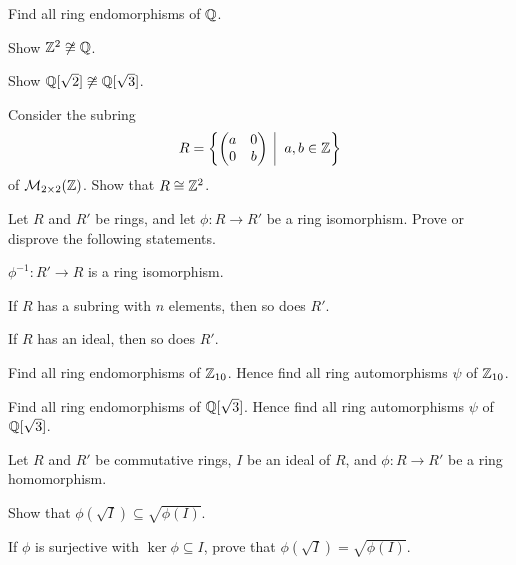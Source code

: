 \begin{problem}
    Find all ring endomorphisms of $\mathbb{Q}$.
\end{problem}

\begin{problem}
    Show $\mathbb{Z}^2 \not\cong \mathbb{Q}$.
\end{problem}

\begin{problem}
    Show $\mathbb{Q}[\sqrt2] \not\cong \mathbb{Q}[\sqrt3]$.
\end{problem}

\begin{problem}
    Consider the subring
    \[
        R = \left\{\begin{pmatrix}a&0\\0&b\end{pmatrix}\vert a,b \in \Z\right\}
    \]
    of $\mathcal{M}_{2\times2}(\mathbb{Z})$. Show that $R \cong \mathbb{Z}^2$.
\end{problem}

\begin{problem}\label{problem-properties-of-ring-isomorphism}
    Let $R$ and $R'$ be rings, and let $\phi: R \to R'$ be a ring isomorphism. Prove or disprove the following statements.
    \begin{partquestions}{\alph*}
        \item $\phi^{-1}: R' \to R$ is a ring isomorphism.
        \item If $R$ has a subring with $n$ elements, then so does $R'$.
        \item If $R$ has an ideal, then so does $R'$.
    \end{partquestions}
\end{problem}

\begin{problem}
    Find all ring endomorphisms of $\mathbb{Z}_{10}$. Hence find all ring automorphisms $\psi$ of $\mathbb{Z}_{10}$.
\end{problem}

\begin{problem}
    Find all ring endomorphisms of $\mathbb{Q}[\sqrt3]$. Hence find all ring automorphisms $\psi$ of $\mathbb{Q}[\sqrt3]$.
\end{problem}

\begin{problem}
    Let $R$ and $R'$ be commutative rings, $I$ be an ideal of $R$, and $\phi: R\to R'$ be a ring homomorphism.
    \begin{partquestions}{\roman*}
        \item Show that $\phi(\sqrt I) \subseteq \sqrt{\phi(I)}$.
        \item If $\phi$ is surjective with $\ker\phi \subseteq I$, prove that $\phi(\sqrt I) = \sqrt{\phi(I)}$.
    \end{partquestions}
\end{problem}


